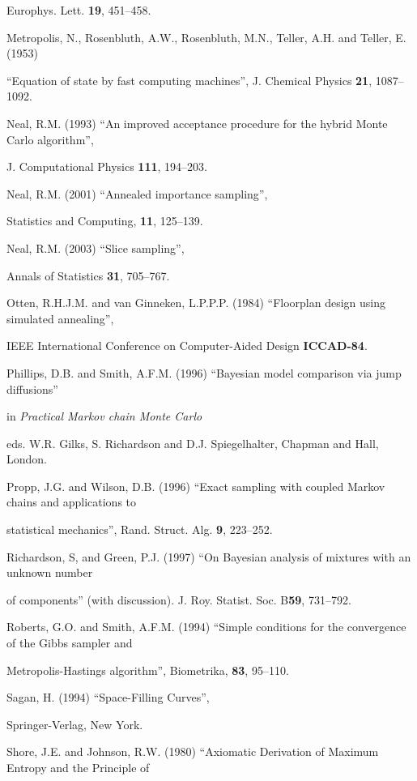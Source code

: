  Europhys. Lett. {\bf 19}, 451--458.

\noindent Metropolis, N., Rosenbluth, A.W., Rosenbluth, M.N., Teller, A.H. and Teller, E. (1953)

 ``Equation of state by fast computing machines'', J. Chemical Physics {\bf 21}, 1087--1092.

\noindent Neal, R.M. (1993) ``An improved acceptance procedure for the hybrid Monte Carlo algorithm'',

 J. Computational Physics {\bf 111}, 194--203.

\noindent Neal, R.M. (2001) ``Annealed importance sampling'',

 Statistics and Computing, {\bf 11}, 125--139.

\noindent Neal, R.M. (2003) ``Slice sampling'',

 Annals of Statistics {\bf 31}, 705--767.

\noindent Otten, R.H.J.M. and van Ginneken, L.P.P.P. (1984) ``Floorplan design using simulated annealing'',

 IEEE International Conference on Computer-Aided Design {\bf ICCAD-84}.

\noindent Phillips, D.B. and Smith, A.F.M. (1996) ``Bayesian model comparison via jump diffusions''

 in {\it Practical Markov chain Monte Carlo}

 eds. W.R. Gilks, S. Richardson and D.J. Spiegelhalter, Chapman and Hall, London.

\noindent Propp, J.G. and Wilson, D.B. (1996) ``Exact sampling with coupled Markov chains and applications to

 statistical mechanics'', Rand. Struct. Alg. {\bf 9}, 223--252.

\noindent Richardson, S, and Green, P.J. (1997) ``On Bayesian analysis of mixtures with an unknown number

 of components'' (with discussion). J. Roy. Statist. Soc. B{\bf 59}, 731--792.

\noindent Roberts, G.O. and Smith, A.F.M. (1994) ``Simple conditions for the convergence of the Gibbs sampler and

 Metropolis-Hastings algorithm'', Biometrika, {\bf 83}, 95--110.

\noindent Sagan, H. (1994) ``Space-Filling Curves'',

 Springer-Verlag, New York.

\noindent Shore, J.E. and Johnson, R.W. (1980) ``Axiomatic Derivation of Maximum Entropy and the Principle of

